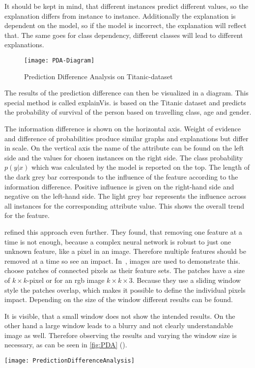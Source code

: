 It should be kept in mind, that different instances predict different values, so the explanation differs from instance to instance. Additionally the explanation is dependent on the model, so if the model is incorrect, the explanation will reflect that. The same goes for class dependency, different classes will lead to different explanations.
\begin{figure}
    \center{}
    \texttt{[image: PDA-Diagram]}
    \caption{Prediction Difference Analysis on Titanic-dataset~\cite{RobnikSikonja.2008}}\label{fig:PDA-titanic}
\end{figure}
The results of the prediction difference can then be visualized in a diagram. This special method is called explainVis.  is based on the Titanic dataset and predicts the probability of survival of the person based on travelling class, age and gender.
\par
The information difference is shown on the horizontal axis. Weight of evidence and difference of probabilities produce similar graphs and explanations but differ in scale. On the vertical axis the name of the attribute can be found on the left side and the values for chosen instances on the right side. The class probability \(p(y|x)\) which was calculated by the model is reported on the top. The length of the dark grey bar corresponds to the influence of the feature according to the information difference. Positive influence is given on the right-hand side and negative on the left-hand side. The light grey bar represents the influence across all instances for the corresponding attribute value. This shows the overall trend for the feature.
\par{} refined this approach even further. They found, that removing one feature at a time is not enough, because a complex neural network is robust to just one unknown feature, like a pixel in an image. Therefore multiple features should be removed at a time so see an impact. In~\cite{Zintgraf.2017}, images are used to demonstrate this. \citeauthor{Zintgraf.2017} choose patches of connected pixels as their feature sets. The patches have a size of \(k\times k\)-pixel or for an rgb image \(k\times k\times 3\). Because they use a sliding window style the patches overlap, which makes it possible to define the individual pixels impact. Depending on the size of the window different results can be found. 
\par
It is visible, that a small window does not show the intended results. On the other hand a large window leads to a blurry and not clearly understandable image as well. Therefore observing the results and varying the window size is necessary, as can be seen in \cref{fig:PDA} (\cite{Zintgraf.2017}). 
\begin{figure*}[ht]
    \center{}
    \texttt{[image: PredictionDifferenceAnalysis]}
    \caption{Prediction Difference Analysis with different window size~\cite{Zintgraf.2017}}\label{fig:PDA}
\end{figure*}

